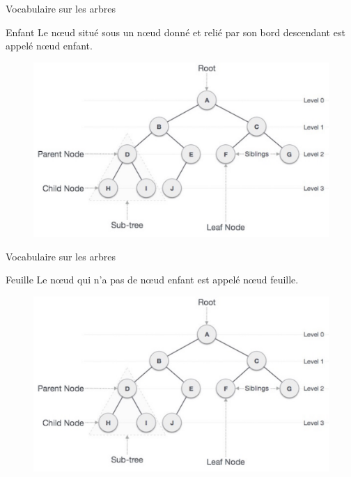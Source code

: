 \documentclass[10pt,xcolor=dvipsnames]{beamer}
\newcommand{\defin}[1]{\textcolor{darkspringgreen}{#1}}
\begin{document}
\begin{frame}{Vocabulaire sur les arbres}
    \begin{exampleblock}{Enfant}
    Le nœud situé sous un nœud donné et relié par son bord descendant est appelé nœud \defin{enfant}.
    \end{exampleblock}
    
    \begin{figure}
    \centering
    \includegraphics[scale=0.2]{figures/CM2/ABR-1.png}
    \label{fig:my_label}
\end{figure}
\end{frame}

\begin{frame}{Vocabulaire sur les arbres}
    \begin{exampleblock}{Feuille}
    Le nœud qui n'a pas de nœud enfant est appelé nœud \defin{feuille}.
    \end{exampleblock}
    
    \begin{figure}
    \centering
    \includegraphics[scale=0.2]{figures/CM2/ABR-1.png}
    \label{fig:my_label}
\end{figure}
\end{frame}
\end{document}
